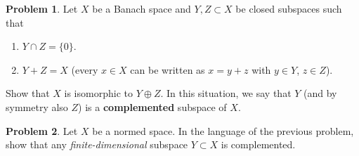\documentclass[12pt]{article}
\theoremstyle{definition}
\newtheorem{ex}{Problem}
\begin{document}
\begin{ex}
  Let $X$ be a Banach space and $Y, Z \subset X$ be closed subspaces such that \begin{enumerate}[label=(\arabic*)]
    \item $Y \cap Z = \lbrace 0 \rbrace$.
    \item $Y + Z = X$ (every $x \in X$ can be written as $x = y + z$ with $y \in Y$, $z \in Z$).
  \end{enumerate}
  Show that $X$ is isomorphic to $Y \oplus Z$.
  In this situation, we say that $Y$ (and by symmetry also $Z$) is a \textbf{complemented} subspace of $X$.
\end{ex}

\begin{ex}
  Let $X$ be a normed space.
  In the language of the previous problem, show that any \textit{finite-dimensional} subspace $Y \subset X$ is complemented.
\end{ex}
\end{document}
